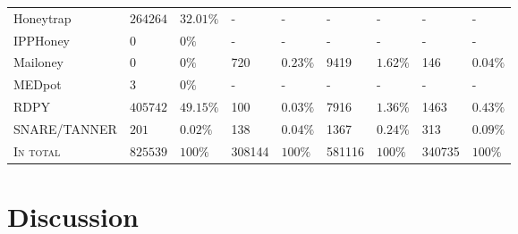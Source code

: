 \begin{table}
\begin{tabularx}{\linewidth}{l|XX|XX|XX|XX}
        Honeytrap \cite{honeytrap2021}            & $264264$                               & $32.01\%$                                & -                                & -                                  & -               & -             & -               & -             \\
        IPPHoney \cite{ipphoney2021}              & $0$                                    & $0\%$                                    & -                                & -                                  & -               & -             & -               & -             \\
        Mailoney \cite{mailoney2021}              & $0$                                    & $0\%$                                    & 720                              & $0.23\%$                           & 9419            & $1.62\%$      & 146             & $0.04\%$      \\
        MEDpot \cite{medpot2021}                  & $3$                                    & $0\%$                                    & -                                & -                                  & -               & -             & -               & -             \\
        RDPY \cite{rdpy2021}                      & $405742$                               & $49.15\%$                                & 100                              & $0.03\%$                           & 7916            & $1.36\%$      & 1463            & $0.43\%$      \\
        SNARE/TANNER \cite{snare2021}             & $201$                                  & $0.02\%$                                 & 138                              & $0.04\%$                           & 1367            & $0.24\%$      & 313             & $0.09\%$      \\
        \hline
        \textsc{In total}                         & $825539$                               & $100\%$                                  & 308144                           & $100\%$                            & 581116          & $100\%$       & 340735          & $100\%$       \\
        \bottomrule
    \end{tabularx}
    \label{tab:overview-honeypots-attacks}
\end{table}

\section{Discussion}

